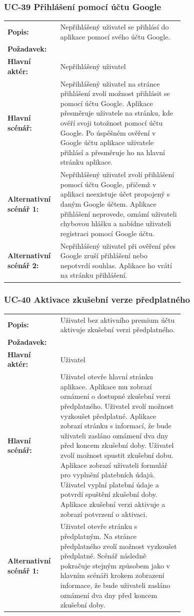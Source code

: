 \subsubsection{UC-39 Přihlášení pomocí účtu Google}

\begin{tabular}{lp{0.7\linewidth}}
  \textbf{Popis:} & Nepřihlášený uživatel se přihlásí do aplikace pomocí svého účtu Google. \\
  \textbf{Požadavek:} & \nameref{sec:fp-google-auth} \\
  \textbf{Hlavní aktér:} & Nepřihlášený uživatel \\
  \textbf{Hlavní scénář:} & Nepřihlášený uživatel na stránce přihlášení zvolí možnost přihlásit se pomocí účtu Google. Aplikace přesměruje uživatele na stránku, kde ověří svoji totožnost pomocí účtu Google. Po úspěšném ověření v Google účtu aplikace uživatele přihlásí a přesměruje ho na hlavní stránku aplikace. \\
  \textbf{Alternativní scénář 1:} & Nepřihlášený uživatel zvolí přihlášení pomocí účtu Google, přičemž v aplikaci neexistuje účet propojený s daným Google účtem. Aplikace přihlášení neprovede, oznámí uživateli chybovou hlášku a nabídne uživateli registraci pomocí Google účtu. \\
  \textbf{Alternativní scénář 2:} & Nepřihlášený uživatel při ověření přes Google zruší přihlášení nebo nepotvrdí souhlas. Aplikace ho vrátí na stránku přihlášení. \\
\end{tabular}

\subsubsection{UC-40 Aktivace zkušební verze předplatného}

\begin{tabular}{lp{0.7\linewidth}}
  \textbf{Popis:} & Uživatel bez aktivního premium účtu aktivuje zkušební verzi předplatného. \\
  \textbf{Požadavek:} & \nameref{sec:fp-free-trial} \\
  \textbf{Hlavní aktér:} & Uživatel \\
  \textbf{Hlavní scénář:} & Uživatel otevře hlavní stránku aplikace. Aplikace mu zobrazí oznámení o dostupné zkušební verzi předplatného. Uživatel zvolí možnost vyzkoušet předplatné. Aplikace zobrazí stránku s informací, že bude uživateli zasláno oznámení dva dny před koncem zkušební doby. Uživatel zvolí možnost spustit zkušební dobu. Aplikace zobrazí uživateli formulář pro vyplnění platebních údajů. Uživatel vyplní platební údaje a potvrdí spuštění zkušební doby. Aplikace zkušební verzi aktivuje a zobrazí potvrzení o aktivaci. \\
  \textbf{Alternativní scénář 1:} & Uživatel otevře stránku s předplatným. Na stránce předplatného zvolí možnost vyzkoušet předplatné. Scénář následně pokračuje stejným způsobem jako v hlavním scénáři krokem zobrazení informace, že bude uživateli zasláno oznámení dva dny před koncem zkušební doby.  \\
\end{tabular}

